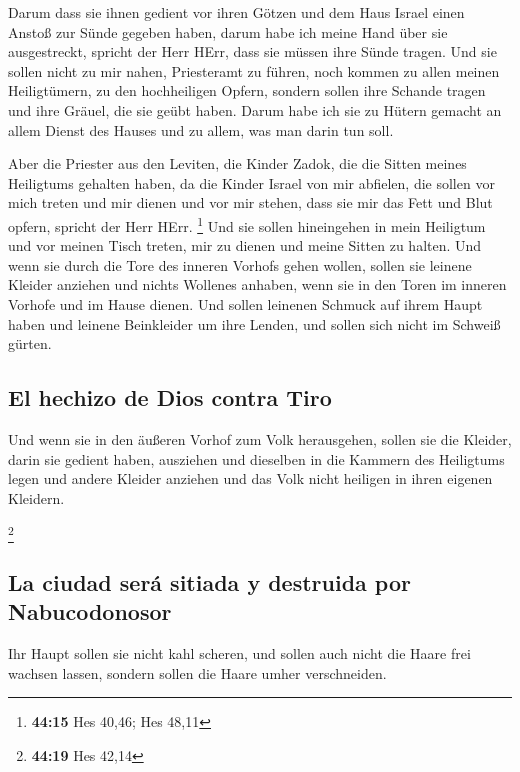  Darum dass sie ihnen gedient vor ihren Götzen und dem
Haus Israel einen Anstoß zur Sünde gegeben haben, darum habe ich meine
Hand über sie ausgestreckt, spricht der Herr HErr, dass sie müssen ihre
Sünde tragen.  Und sie sollen nicht zu mir nahen,
Priesteramt zu führen, noch kommen zu allen meinen Heiligtümern, zu den
hochheiligen Opfern, sondern sollen ihre Schande tragen und ihre Gräuel,
die sie geübt haben.  Darum habe ich sie zu Hütern
gemacht an allem Dienst des Hauses und zu allem, was man darin tun soll.

 Aber die Priester aus den Leviten, die Kinder Zadok, die
die Sitten meines Heiligtums gehalten haben, da die Kinder Israel von
mir abfielen, die sollen vor mich treten und mir dienen und vor mir
stehen, dass sie mir das Fett und Blut opfern, spricht der Herr HErr.
\footnote{\textbf{44:15} Hes 40,46; Hes 48,11}  Und sie
sollen hineingehen in mein Heiligtum und vor meinen Tisch treten, mir zu
dienen und meine Sitten zu halten.  Und wenn sie durch
die Tore des inneren Vorhofs gehen wollen, sollen sie leinene Kleider
anziehen und nichts Wollenes anhaben, wenn sie in den Toren im inneren
Vorhofe und im Hause dienen.  Und sollen leinenen Schmuck
auf ihrem Haupt haben und leinene Beinkleider um ihre Lenden, und sollen
sich nicht im Schweiß gürten.

\hypertarget{el-hechizo-de-dios-contra-tiro}{%
\subsection{El hechizo de Dios contra
Tiro}\label{el-hechizo-de-dios-contra-tiro}}

 Und wenn sie in den äußeren Vorhof zum Volk herausgehen,
sollen sie die Kleider, darin sie gedient haben, ausziehen und dieselben
in die Kammern des Heiligtums legen und andere Kleider anziehen und das
Volk nicht heiligen in ihren eigenen Kleidern.

\footnote{\textbf{44:19} Hes 42,14}

\hypertarget{la-ciudad-seruxe1-sitiada-y-destruida-por-nabucodonosor}{%
\subsection{La ciudad será sitiada y destruida por
Nabucodonosor}\label{la-ciudad-seruxe1-sitiada-y-destruida-por-nabucodonosor}}

 Ihr Haupt sollen sie nicht kahl scheren, und sollen auch
nicht die Haare frei wachsen lassen, sondern sollen die Haare umher
verschneiden.

